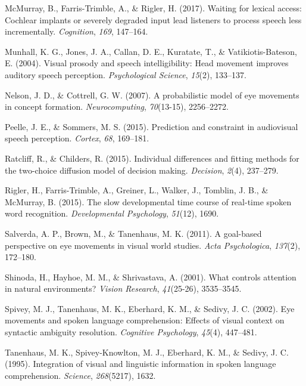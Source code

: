 \documentclass[,man,floatsintext]{apa6}
\begin{document}
\hypertarget{ref-mcmurray2017waiting}{}
McMurray, B., Farris-Trimble, A., \& Rigler, H. (2017). Waiting for
lexical access: Cochlear implants or severely degraded input lead
listeners to process speech less incrementally. \emph{Cognition},
\emph{169}, 147--164.

\hypertarget{ref-munhall2004visual}{}
Munhall, K. G., Jones, J. A., Callan, D. E., Kuratate, T., \&
Vatikiotis-Bateson, E. (2004). Visual prosody and speech
intelligibility: Head movement improves auditory speech perception.
\emph{Psychological Science}, \emph{15}(2), 133--137.

\hypertarget{ref-nelson2007probabilistic}{}
Nelson, J. D., \& Cottrell, G. W. (2007). A probabilistic model of eye
movements in concept formation. \emph{Neurocomputing}, \emph{70}(13-15),
2256--2272.

\hypertarget{ref-peelle2015prediction}{}
Peelle, J. E., \& Sommers, M. S. (2015). Prediction and constraint in
audiovisual speech perception. \emph{Cortex}, \emph{68}, 169--181.

\hypertarget{ref-ratcliff2015individual}{}
Ratcliff, R., \& Childers, R. (2015). Individual differences and fitting
methods for the two-choice diffusion model of decision making.
\emph{Decision}, \emph{2}(4), 237--279.

\hypertarget{ref-rigler2015slow}{}
Rigler, H., Farris-Trimble, A., Greiner, L., Walker, J., Tomblin, J. B.,
\& McMurray, B. (2015). The slow developmental time course of real-time
spoken word recognition. \emph{Developmental Psychology}, \emph{51}(12),
1690.

\hypertarget{ref-salverda2011goal}{}
Salverda, A. P., Brown, M., \& Tanenhaus, M. K. (2011). A goal-based
perspective on eye movements in visual world studies. \emph{Acta
Psychologica}, \emph{137}(2), 172--180.

\hypertarget{ref-shinoda2001controls}{}
Shinoda, H., Hayhoe, M. M., \& Shrivastava, A. (2001). What controls
attention in natural environments? \emph{Vision Research},
\emph{41}(25-26), 3535--3545.

\hypertarget{ref-spivey2002eye}{}
Spivey, M. J., Tanenhaus, M. K., Eberhard, K. M., \& Sedivy, J. C.
(2002). Eye movements and spoken language comprehension: Effects of
visual context on syntactic ambiguity resolution. \emph{Cognitive
Psychology}, \emph{45}(4), 447--481.

\hypertarget{ref-tanenhaus1995integration}{}
Tanenhaus, M. K., Spivey-Knowlton, M. J., Eberhard, K. M., \& Sedivy, J.
C. (1995). Integration of visual and linguistic information in spoken
language comprehension. \emph{Science}, \emph{268}(5217), 1632.
\end{document}
